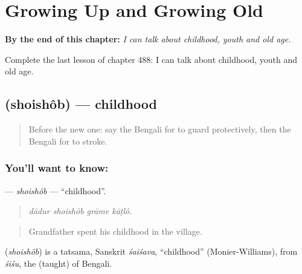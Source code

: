 
\chapter{Growing Up and Growing Old}
\label{ch:bn-growing-up-and-growing-old}

\begin{chapteropening}
\textbf{By the end of this chapter:} \emph{I can talk about childhood, youth and old age.}

Complete the last lesson of chapter 488: I can talk about childhood, youth and old age.
\end{chapteropening}

\section[\texorpdfstring{\bn{শৈশব} (shoishôb)}{শৈশব (shoishôb)}]{ (shoishôb) — childhood}

\label{lesson:BN-C488-shoishob}



\begin{quote}
Before the new one: say the Bengali for to guard protectively, then the Bengali for to stroke.
\end{quote}

\subsection*{You'll want to know: }
\textbf{} — \emph{shoishôb} — \textquotedblleft{}childhood\textquotedblright{}.

\begin{quote}
   
\end{quote}

\begin{quote}
\emph{dādur shoishôb grāme kāṭlô.}
\end{quote}

\begin{quote}
Grandfather spent his childhood in the village.
\end{quote}

\begin{cousinweb}
\textbf{} (\emph{shoishôb}) is a tatsama, Sanskrit \emph{śaiśava}, \textquotedblleft{}childhood\textquotedblright{} (Monier-Williams), from \emph{śiśu}, the  (taught) of Bengali.
\end{cousinweb}

